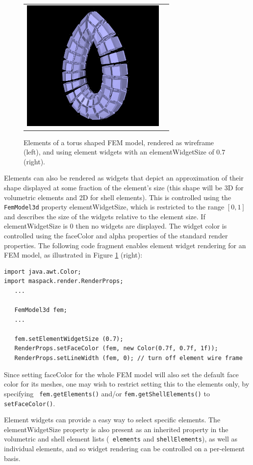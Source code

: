 \begin{figure}[h]
\begin{center}
\begin{tabular}{cc}
 \includegraphics[width=2.8in]{images/torusElemWidgets}
\fi
\end{tabular}
\end{center}
\caption{Elements of a torus shaped FEM model, rendered
as wireframe (left), and using element widgets with an {\sf
elementWidgetSize} of $0.7$ (right).}
\label{femElemRender:fig} 
\end{figure}

Elements can also be rendered as widgets that depict an approximation
of their shape displayed at some fraction of the element's size (this
shape will be 3D for volumetric elements and 2D for shell
elements). This is controlled using the {\tt FemModel3d} property {\sf
elementWidgetSize}, which is restricted to the range $[0, 1]$ and
describes the size of the widgets relative to the element size. If
{\sf elementWidgetSize} is 0 then no widgets are displayed.  The
widget color is controlled using the {\sf faceColor} and {\sf alpha}
properties of the standard render properties.  The following code
fragment enables element widget rendering for an FEM model, as
illustrated in Figure \ref{femElemRender:fig} (right):
%
\begin{lstlisting}[]
import java.awt.Color;
import maspack.render.RenderProps;
   ...

   FemModel3d fem;
   ...

   fem.setElementWidgetSize (0.7);
   RenderProps.setFaceColor (fem, new Color(0.7f, 0.7f, 1f));
   RenderProps.setLineWidth (fem, 0); // turn off element wire frame
\end{lstlisting}
%
Since setting {\sf faceColor} for the whole FEM model will also set
the default face color for its meshes, one may wish to restrict
setting this to the elements only, by specifying {\tt
fem.getElements()} and/or {\tt fem.getShellElements()} to {\tt
setFaceColor()}.

Element widgets can provide a easy way to select specific
elements. The {\sf elementWidgetSize} property is also present as an
inherited property in the volumetric and shell element lists ({\tt
elements} and {\tt shellElements}), as well as individual elements,
and so widget rendering can be controlled on a per-element basis.


